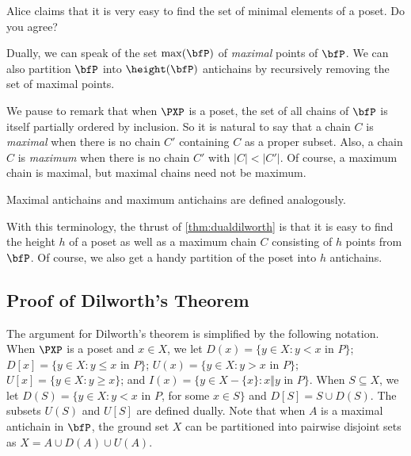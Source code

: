 \begin{remark}
Alice claims that it is very easy to find the set of minimal elements of
a poset.  Do you agree?
\end{remark}

Dually, we can speak of the set $\max(\bfP)$ of \textit{maximal} points
of $\bfP$.  We can also partition $\bfP$ into $\height(\bfP)$ antichains
by recursively removing the set of maximal points.

We pause to remark that when $\PXP$ is a poset, the set of all chains of
$\bfP$ is itself partially ordered by inclusion.  So it is natural to
say that a chain $C$ is \textit{maximal} when there is no chain
$C'$ containing $C$ as a proper subset.  Also, a chain $C$ is \textit{maximum}
when there is no chain $C'$ with $|C|<|C'|$.  Of course, a maximum chain
is maximal, but maximal chains need not be maximum.

Maximal antichains and maximum antichains are defined analogously.

With this terminology, the thrust of \autoref{thm:dualdilworth} is
that it is easy to find the height $h$ of a poset as well as a maximum
chain $C$ consisting of $h$ points from $\bfP$.  Of course, we also get
a handy partition of the poset into $h$ antichains.

\subsection{Proof of Dilworth's Theorem}

The argument for Dilworth's theorem is simplified by the 
following notation. When $\PXP$ is a poset and $x\in X$, we let $D(x)=\{y\in 
X:y<x \text{ in }P\}$; $D[x]=\{y\in X:y\le x\text{ in }P\}$; $U(x)=\{y\in X:y>x
\text{ in }P\}$; $U[x]=\{y\in X:y\ge x\}$; and $I(x)=\{y\in X-\{x\}:x\Vert y
\text{ in }P\}$. When $S\subseteq  X$, we let $D(S)=
\{y\in X:y<x$ in $P$, for some $x\in S\}$ and $D[S]=S\cup D(S)$. The
subsets $U(S)$ and $U[S]$ are defined dually.  Note that when 
$A$ is a maximal antichain in $\bfP$, the ground set $X$ can be
partitioned into pairwise disjoint sets as $X=A\cup D(A)\cup U(A)$.

